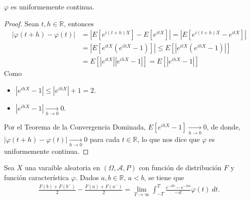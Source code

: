 \begin{teo}
    $\varphi$ es uniformemente continua.
\end{teo}

\begin{proof}
    Sean $t,h \in \mathbb{R}$, entonces
    \begin{align*}
        |\varphi(t+h) - \varphi(t)| &= \left| E\left[ e^{i(t+h)X} \right] - E\left[ e^{itX} \right] \right| = \left|E\left[ e^{i(t+h)X} - e^{itX} \right] \right| \\
        &= \left|E\left[ e^{itX}\left( e^{ihX} - 1 \right) \right] \right| \leq E\left[ \left|e^{itX}\left( e^{ihX} - 1 \right) \right|\right] \\
        &= E\left[ \left|e^{itX}\right|\left| e^{ihX} - 1 \right| \right] = E\left[\left| e^{ihX} - 1 \right| \right]
    \end{align*}
    Como 
    \begin{itemize}
        \item $\left| e^{ihX} - 1\right| \leq \left| e^{ihX} \right| + 1 = 2$.
        \item $\left| e^{ihX} - 1 \right| \xrightarrow[h \to 0]{} 0$.
    \end{itemize}
    Por el Teorema de la Convergencia Dominada, $E\left[ e^{ihX} - 1\right] \xrightarrow[h \to 0]{} 0$, de donde, $|\varphi(t+h) - \varphi(t)| \xrightarrow[h \to 0]{} 0 $ para cada $t \in \mathbb{R}$, lo que nos dice que $\varphi$ es uniformemente continua.
\end{proof}

\begin{teo}[de inversión]
    Sea $X$ una varaible aleatoria en $(\Omega, \mathcal{A}, P)$ con función de distribución $F$ y función característica $\varphi$. Dados $a,b \in \mathbb{R}$, $a < b$, se tiene que
    \begin{align*}
        \frac{F(b) + F(b^-)}{2} - \frac{F(a) + F(a^-)}{2} = \lim_{T \to \infty} \int_{-T}^{T} \frac{e^{-itb} - e^{-ita}}{-it} \varphi(t) \ dt.
    \end{align*}
\end{teo}

